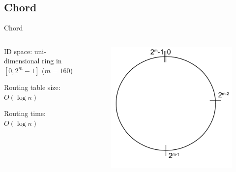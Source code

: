\subsection{Chord}

\begin{frame}{Chord}

\begin{columns}
\begin{column}{0.72\textwidth}
\BI
\item ID space: uni-dimensional ring in $[0, 2^{m}-1]$ ($m=160$)
\item Routing table size: $O(\log n)$
\item Routing time: $O(\log n)$	
\EI
\end{column}
\begin{column}{0.28\textwidth}
\begin{figure}
\includegraphics[width=1.0\textwidth]{figs/10/chord-example1}
\end{figure}
\end{column}
\end{columns}

\begin{Bib}
{\scriptsize
{}
}\end{Bib}
	
\end{frame}

